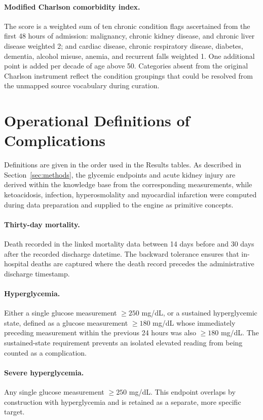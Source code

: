 \paragraph{Modified Charlson comorbidity index.}
The score is a weighted sum of ten chronic condition flags ascertained from
the first 48 hours of admission: malignancy, chronic kidney disease, and
chronic liver disease weighted 2; and cardiac disease, chronic respiratory
disease, diabetes, dementia, alcohol misuse, anemia, and recurrent falls
weighted 1. One additional point is added per decade of age above 50.
Categories absent from the original Charlson instrument reflect the
condition groupings that could be resolved from the unmapped source
vocabulary during curation.

\section{Operational Definitions of Complications}
\label{app:definitions}

Definitions are given in the order used in the Results tables. As described
in Section~\ref{sec:methods}, the glycemic endpoints and acute kidney injury
are derived within the knowledge base from the corresponding measurements,
while ketoacidosis, infection, hyperosmolality and myocardial infarction were
computed during data preparation and supplied to the engine as primitive
concepts.

\paragraph{Thirty-day mortality.}
Death recorded in the linked mortality data between 14 days before and 30
days after the recorded discharge datetime. The backward tolerance ensures
that in-hospital deaths are captured where the death record precedes the
administrative discharge timestamp.

\paragraph{Hyperglycemia.}
Either a single glucose measurement $\geq250$ mg/dL, or a sustained
hyperglycemic state, defined as a glucose measurement $\geq180$ mg/dL whose
immediately preceding measurement within the previous 24 hours was also
$\geq180$ mg/dL. The sustained-state requirement prevents an isolated
elevated reading from being counted as a complication.

\paragraph{Severe hyperglycemia.}
Any single glucose measurement $\geq250$ mg/dL. This endpoint overlaps by
construction with hyperglycemia and is retained as a separate, more specific
target.

